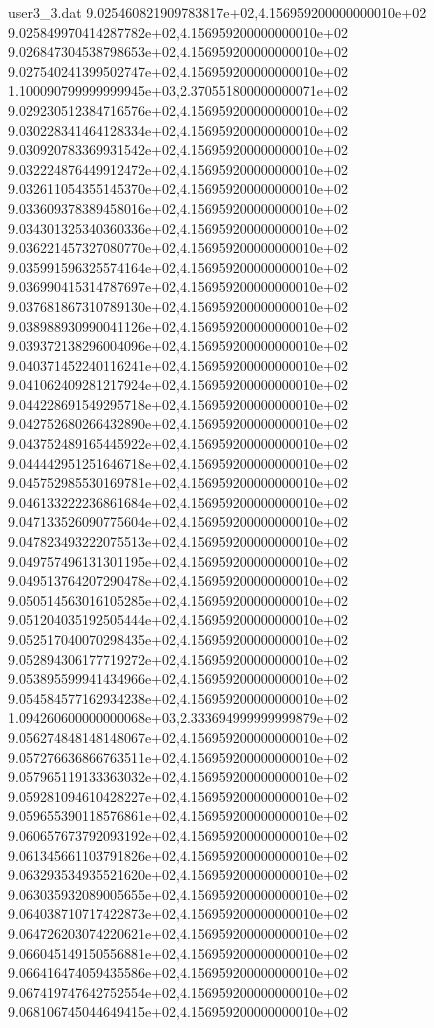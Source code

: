 \begin{filecontents}{user3_3.dat}
9.025460821909783817e+02,4.156959200000000010e+02
9.025849970414287782e+02,4.156959200000000010e+02
9.026847304538798653e+02,4.156959200000000010e+02
9.027540241399502747e+02,4.156959200000000010e+02
1.100090799999999945e+03,2.370551800000000071e+02
9.029230512384716576e+02,4.156959200000000010e+02
9.030228341464128334e+02,4.156959200000000010e+02
9.030920783369931542e+02,4.156959200000000010e+02
9.032224876449912472e+02,4.156959200000000010e+02
9.032611054355145370e+02,4.156959200000000010e+02
9.033609378389458016e+02,4.156959200000000010e+02
9.034301325340360336e+02,4.156959200000000010e+02
9.036221457327080770e+02,4.156959200000000010e+02
9.035991596325574164e+02,4.156959200000000010e+02
9.036990415314787697e+02,4.156959200000000010e+02
9.037681867310789130e+02,4.156959200000000010e+02
9.038988930990041126e+02,4.156959200000000010e+02
9.039372138296004096e+02,4.156959200000000010e+02
9.040371452240116241e+02,4.156959200000000010e+02
9.041062409281217924e+02,4.156959200000000010e+02
9.044228691549295718e+02,4.156959200000000010e+02
9.042752680266432890e+02,4.156959200000000010e+02
9.043752489165445922e+02,4.156959200000000010e+02
9.044442951251646718e+02,4.156959200000000010e+02
9.045752985530169781e+02,4.156959200000000010e+02
9.046133222236861684e+02,4.156959200000000010e+02
9.047133526090775604e+02,4.156959200000000010e+02
9.047823493222075513e+02,4.156959200000000010e+02
9.049757496131301195e+02,4.156959200000000010e+02
9.049513764207290478e+02,4.156959200000000010e+02
9.050514563016105285e+02,4.156959200000000010e+02
9.051204035192505444e+02,4.156959200000000010e+02
9.052517040070298435e+02,4.156959200000000010e+02
9.052894306177719272e+02,4.156959200000000010e+02
9.053895599941434966e+02,4.156959200000000010e+02
9.054584577162934238e+02,4.156959200000000010e+02
1.094260600000000068e+03,2.333694999999999879e+02
9.056274848148148067e+02,4.156959200000000010e+02
9.057276636866763511e+02,4.156959200000000010e+02
9.057965119133363032e+02,4.156959200000000010e+02
9.059281094610428227e+02,4.156959200000000010e+02
9.059655390118576861e+02,4.156959200000000010e+02
9.060657673792093192e+02,4.156959200000000010e+02
9.061345661103791826e+02,4.156959200000000010e+02
9.063293534935521620e+02,4.156959200000000010e+02
9.063035932089005655e+02,4.156959200000000010e+02
9.064038710717422873e+02,4.156959200000000010e+02
9.064726203074220621e+02,4.156959200000000010e+02
9.066045149150556881e+02,4.156959200000000010e+02
9.066416474059435586e+02,4.156959200000000010e+02
9.067419747642752554e+02,4.156959200000000010e+02
9.068106745044649415e+02,4.156959200000000010e+02

\end{filecontents}
